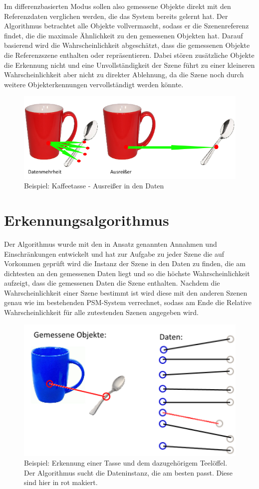 Im differenzbasierten Modus sollen also gemessene Objekte direkt mit den Referenzdaten verglichen werden, die das System bereits gelernt hat. Der Algorithmus betrachtet alle Objekte vollvermascht, sodass er die Szenenreferenz findet, die die maximale Ähnlichkeit zu den gemessenen Objekten hat. Darauf basierend wird die Wahrscheinlichkeit abgeschätzt, dass die gemessenen Objekte die Referenzszene enthalten oder repräsentieren. Dabei stören zusätzliche Objekte die Erkennung nicht und eine Unvollständigkeit der Szene führt zu einer kleineren Wahrscheinlichkeit aber nicht zu direkter Ablehnung, da die Szene noch durch weitere Objekterkennungen vervollständigt werden könnte.\cite{fepezi05}
\begin{figure}
	\centering
	\includegraphics[width=14cm]{bilder/KonzeptAnsatz.pdf}
	\caption{Beispiel: Kaffeetasse - Ausrei\ss{}er in den Daten}
	\label{img:ausreisser}
\end{figure}
\section{Erkennungsalgorithmus}\label{sec:algconcept}
Der Algorithmus wurde mit den in Ansatz genannten Annahmen und Einschränkungen entwickelt und hat zur Aufgabe zu jeder Szene die auf Vorkommen geprüft wird die Instanz der Szene in den Daten zu finden, die am dichtesten an den gemessenen Daten liegt und so die höchste Wahrscheinlichkeit aufzeigt, dass die gemessenen Daten die Szene enthalten. Nachdem die Wahrscheinlichkeit einer Szene bestimmt ist wird diese mit den anderen Szenen genau wie im bestehenden PSM-System verrechnet, sodass am Ende die Relative Wahrscheinlichkeit für alle zutestenden Szenen angegeben wird.
\begin{figure}
	\centering
	\includegraphics[width=12cm]{bilder/konzeptpic.pdf}
	\caption{Beispiel: Erkennung einer Tasse und dem dazugehörigem Teelöffel. Der Algorithmus sucht die Dateninstanz, die am besten passt. Diese sind hier in rot makiert.}
	\label{img:konzeptpic}
\end{figure}
